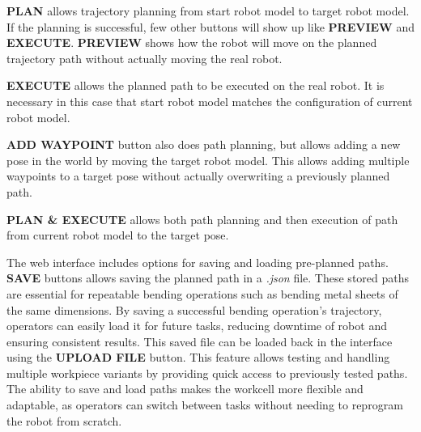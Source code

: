 \textbf{PLAN} allows trajectory planning from start robot model to target robot model. If the planning is successful, few other buttons will show up like \textbf{PREVIEW} and \textbf{EXECUTE}. \textbf{PREVIEW} shows how the robot will move on the planned trajectory path without actually moving the real robot. 

\textbf{EXECUTE} allows the planned path to be executed on the real robot. It is necessary in this case that start robot model matches the configuration of current robot model.

\textbf{ADD WAYPOINT} button also does path planning, but allows adding a new pose in the world by moving the target robot model. This allows adding multiple waypoints to a target pose without actually overwriting a previously planned path.

\textbf{PLAN \& EXECUTE} allows both path planning and then execution of path from current robot model to the target pose.

\vspace{\baselineskip}
The web interface includes options for saving and loading pre-planned paths. \textbf{SAVE} buttons allows saving the planned path in a \textit{.json} file. 
These stored paths are essential for repeatable bending operations such as bending metal sheets of the same dimensions. By saving a successful bending operation's trajectory, operators can easily load it for future tasks, reducing downtime of robot and ensuring consistent results. This saved file can be loaded back in the interface using the \textbf{UPLOAD FILE} button. This feature allows testing and handling multiple workpiece variants by providing quick access to previously tested paths. The ability to save and load paths makes the workcell more flexible and adaptable, as operators can switch between tasks without needing to reprogram the robot from scratch.


